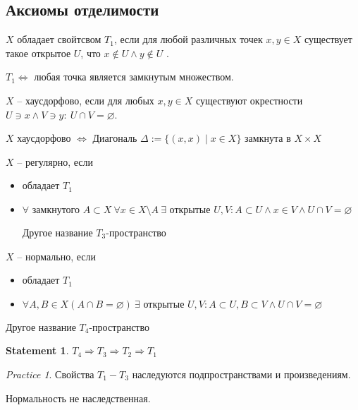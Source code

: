 \documentclass[11pt]{book}
\theoremstyle{definition}
\theoremstyle{plain}
\theoremstyle{plain}
\newtheorem*{st}{Statement}
\theoremstyle{definition}
\theoremstyle{remark}
\newtheorem*{prac}{Practice}
\begin{document}
\subsection{Аксиомы отделимости}
\begin{defn}
    $ X$ обладает свойтсвом $ T_1$, если для любой различных точек $ x, y \in X$ существует такое открытое $ U$, что $ x \not\in U \wedge y \not\in U$ .
\end{defn}
\begin{thm}
    $ T_1 \Longleftrightarrow $  любая точка является замкнутым множеством.
\end{thm}
\begin{defn}
    $ X$ -- хаусдорфово, если для любых $ x, y \in  X$ существуют окрестности $ U \ni x \wedge V \ni y: ~ U \cap V = \varnothing$.
\end{defn}
\begin{defn}
    $ X$ хаусдорфово $ \Longleftrightarrow $ Диагональ $ \Delta := \{(x, x) \mid x \in  X\}$ замкнута в $ X \times X$
\end{defn}
\begin{defn}
    $ X$ -- регулярно, если
    \begin{itemize}
	\item обладает $ T_1$
	\item $ \forall  \text{ замкнутого }A \subset X~ \forall x \in  X \setminus A~ \exists \text{ открытые } U, V : A \subset  U \wedge x \in V \wedge U \cap  V = \varnothing $

	    Другое название $ T_3$-пространство
    \end{itemize}
\end{defn}
\begin{defn}
    $ X$ -- нормально, если
    \begin{itemize}
	\item обладает $ T_1$
	\item $ \forall  A, B \in  X (A \cap  B = \varnothing) ~ \exists  \text{ открытые } U, V: A \subset U,  B  \subset V  \wedge U \cap  V= \varnothing$
    \end{itemize}

    Другое название $ T_4$-пространство
\end{defn}
\begin{st}
    $ T_4 \Rightarrow T_3 \Rightarrow  T_2 \Rightarrow T_1$
\end{st}
\begin{prac}
    Свойства $ T_1 - T_3$ наследуются подпространствами и произведениям.

    Нормальность не наследственная.
\end{prac}
\end{document}
